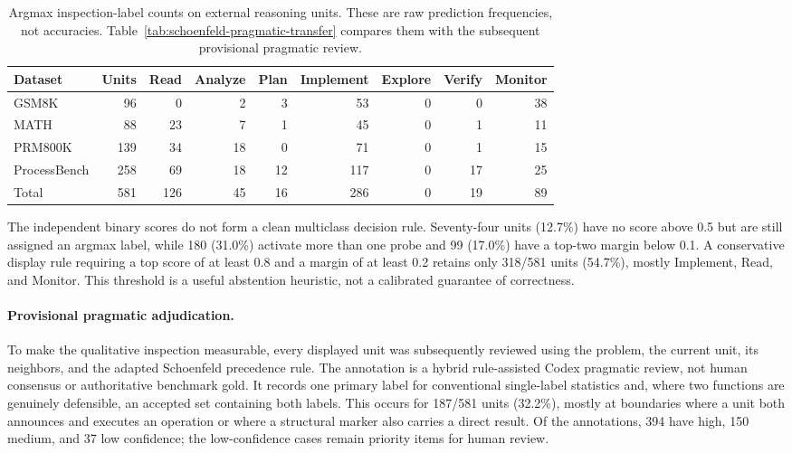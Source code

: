\begin{table}[t]
\centering
\caption{Argmax inspection-label counts on external reasoning units.  These
are raw prediction frequencies, not accuracies.  Table~\ref{tab:schoenfeld-pragmatic-transfer}
compares them with the subsequent provisional pragmatic review.
}
\label{tab:schoenfeld-external-labels}
\begin{tabular}{lrrrrrrrr}
\toprule
Dataset & Units & Read & Analyze & Plan & Implement & Explore & Verify & Monitor \\
\midrule
GSM8K        &  96 &   0 &  2 &  3 &  53 & 0 &  0 & 38 \\
MATH         &  88 &  23 &  7 &  1 &  45 & 0 &  1 & 11 \\
PRM800K      & 139 &  34 & 18 &  0 &  71 & 0 &  1 & 15 \\
ProcessBench & 258 &  69 & 18 & 12 & 117 & 0 & 17 & 25 \\
\midrule
Total        & 581 & 126 & 45 & 16 & 286 & 0 & 19 & 89 \\
\bottomrule
\end{tabular}
\end{table}

The independent binary scores do not form a clean multiclass decision rule.
Seventy-four units (12.7\%) have no score above 0.5 but are still assigned an
argmax label, while 180 (31.0\%) activate more than one probe and 99 (17.0\%)
have a top-two margin below 0.1.  A conservative display rule requiring a top
score of at least 0.8 and a margin of at least 0.2 retains only 318/581 units
(54.7\%), mostly Implement, Read, and Monitor.  This threshold is a useful
abstention heuristic, not a calibrated guarantee of correctness.

\paragraph{Provisional pragmatic adjudication.}
To make the qualitative inspection measurable, every displayed unit was
subsequently reviewed using the problem, the current unit, its neighbors, and
the adapted Schoenfeld precedence rule.  The annotation is a hybrid
rule-assisted Codex pragmatic review, not human consensus or authoritative
benchmark gold.  It records one primary label for conventional single-label
statistics and, where two functions are genuinely defensible, an accepted
set containing both labels.  This occurs for 187/581 units (32.2\%), mostly
at boundaries where a unit both announces and executes an operation or where
a structural marker also carries a direct result.  Of the annotations, 394
have high, 150 medium, and 37 low confidence; the low-confidence cases remain
priority items for human review.

